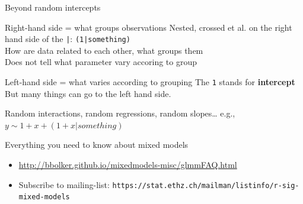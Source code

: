 \documentclass{beamer}
\begin{document}
\begin{frame}{Beyond random intercepts}


\begin{alertblock}{Right-hand side = what groups observations}
Nested, crossed et al. on the right hand side of the \texttt{|}: \texttt{(1|something)}\\
How are data related to each other, what groups them\\
Does not tell what parameter vary accoring to group
\end{alertblock}


\pause
\begin{alertblock}{Left-hand side = what varies according to grouping}
The \texttt{1} stands for \textbf{intercept}\\
But many things can go to the left hand side. 
\end{alertblock}

\pause

\begin{exampleblock}{Random interactions, random regressions, random slopes\dots}
 e.g., $y \sim 1 + x + (1 + x|something)$
\end{exampleblock}
 
\end{frame}



\begin{frame}{Everything you need to know about mixed models}

\begin{itemize}
 \item \url{http://bbolker.github.io/mixedmodels-misc/glmmFAQ.html}
 \item Subscribe to mailing-list: \texttt{https://stat.ethz.ch/mailman/listinfo/r-sig-mixed-models}
\end{itemize}

\end{frame}
\end{document}

